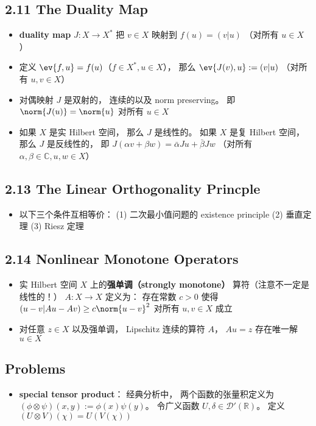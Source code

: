\subsection{2.11 The Duality Map}
\begin{itemize}
\item \textbf{duality map} $J: X\to X^*$ 把 $v\in X$ 映射到 $f(u) = (v|u)$ （对所有 $u\in X$）

\item 定义 $\ev{f, u} = f(u)$（$f\in X^*, u\in X$）， 那么 $\ev{J(v), u} := (v|u)$ （对所有 $u, v\in X$）

\item 对偶映射 $J$ 是双射的， 连续的以及 norm preserving。 即 $\norm{J(u)} = \norm{u}$ 对所有 $u\in X$

\item 如果 $X$ 是实 Hilbert 空间， 那么 $J$ 是线性的。 如果 $X$ 是复 Hilbert 空间， 那么 $J$ 是反线性的， 即 $J(\alpha v + \beta w) = \bar \alpha Ju + \bar \beta Jw$ （对所有 $\alpha,\beta\in\mathbb C, u, w\in X$）
\end{itemize}

\subsection{2.13 The Linear Orthogonality Princple}
\begin{itemize}
\item 以下三个条件互相等价： (1) 二次最小值问题的 existence principle (2) 垂直定理 (3) Riesz 定理
\end{itemize}

\subsection{2.14 Nonlinear Monotone Operators}
\begin{itemize}
\item 实 Hilbert 空间 $X$ 上的\textbf{强单调（strongly monotone）} 算符（注意不一定是线性的！） $A:X\to X$ 定义为： 存在常数 $c > 0$ 使得 $(u-v|Au - Av) \ge c\norm{u-v}^2$ 对所有 $u, v\in X$ 成立

\item 对任意 $z \in X$ 以及强单调， Lipschitz 连续的算符 $A$， $Au = z$ 存在唯一解 $u\in X$
\end{itemize}

\subsection{Problems}
\begin{itemize}
\item \textbf{special tensor product}： 经典分析中， 两个函数的张量积定义为 $(\phi\otimes\psi)(x,y) := \phi(x)\psi(y)$。 令广义函数 $U, \delta \in \mathcal D'(\mathbb R)$。 定义 $(U\otimes V)(\chi) = U(V(\chi))$
\end{itemize}
